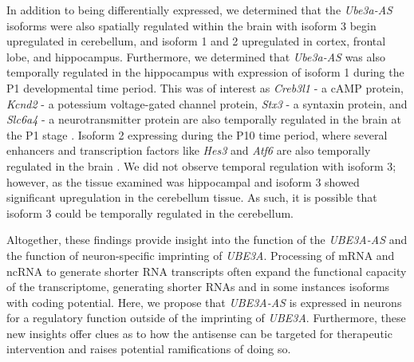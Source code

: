 In addition to being differentially expressed, we determined that the \textit{Ube3a-AS} isoforms were also spatially regulated within the brain with isoform 3 begin upregulated in cerebellum, and isoform 1 and 2 upregulated in cortex, frontal lobe, and hippocampus. Furthermore, we determined that \textit{Ube3a-AS} was also temporally regulated in the hippocampus with expression of isoform 1 during the P1 developmental time period. This was of interest as \textit{Creb3l1} - a cAMP protein, \textit{Kcnd2} - a potessium voltage-gated channel protein, \textit{Stx3} - a syntaxin protein, and \textit{Slc6a4} - a neurotransmitter protein are also temporally regulated in the brain at the P1 stage \cite{BrainScience2008,Sunkin2012}. Isoform 2 expressing during the P10 time period, where several enhancers and transcription factors like \textit{Hes3} and \textit{Atf6} are also temporally regulated in the brain \cite{BrainScience2008,Sunkin2012}. We did not observe temporal regulation with isoform 3; however, as the tissue examined was hippocampal and isoform 3 showed significant upregulation in the cerebellum tissue. As such, it is possible that isoform 3 could be temporally regulated in the cerebellum. 

Altogether, these findings provide insight into the function of the \textit{UBE3A-AS} and the function of neuron-specific imprinting of \textit{UBE3A}. Processing of mRNA and ncRNA to generate shorter RNA transcripts often expand the functional capacity of the transcriptome, generating shorter RNAs and in some instances isoforms with coding potential. Here, we propose that \textit{UBE3A-AS} is expressed in neurons for a regulatory function outside of the imprinting of \textit{UBE3A}. Furthermore, these new insights offer clues as to how the antisense can be targeted for therapeutic intervention and raises potential ramifications of doing so.
